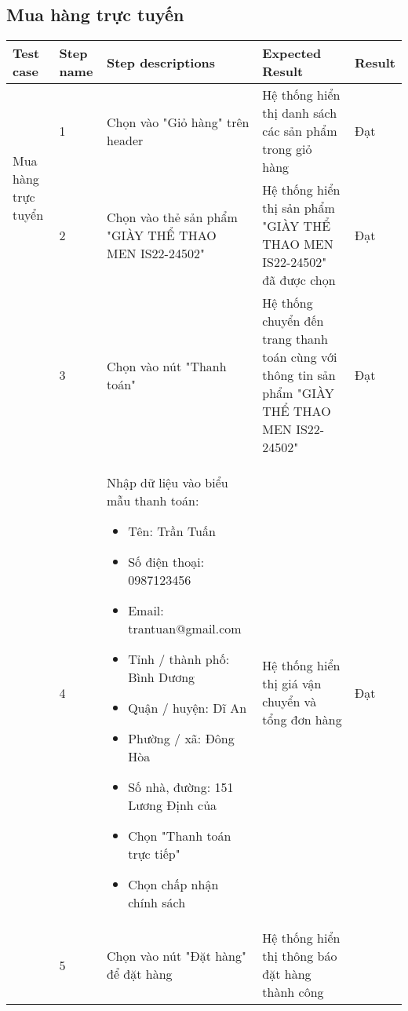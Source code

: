 \subsection{Mua hàng trực tuyến}
{
    \setlength\extrarowheight{6pt}
    \begin{longtable}{| p{2.5cm}| p{1cm}| p{5.5cm}| p{4.5cm} | p{1.5cm} |}
        \hline
        \textbf{Test case} & \textbf{Step name} & \textbf{Step descriptions} & \textbf{Expected Result} & \textbf{Result} \\
        \hline
        \multirow[t]{2}{2.5cm}{Mua hàng trực tuyển} & 
        1 & 
        Chọn vào "Giỏ hàng" trên header & 
        Hệ thống hiển thị danh sách các sản phẩm trong giỏ hàng & 
        Đạt \\
        \cline{2-5}
         & 2 & 
         Chọn vào thẻ sản phẩm "GIÀY THỂ THAO MEN IS22-24502" & 
         Hệ thống hiển thị sản phẩm "GIÀY THỂ THAO MEN IS22-24502" đã được chọn & 
         Đạt \\
        \cline{2-5}
         & 3 & 
         Chọn vào nút "Thanh toán" & 
         Hệ thống chuyển đến trang thanh toán cùng với thông tin sản phẩm "GIÀY THỂ THAO MEN IS22-24502" & 
         Đạt \\
        \cline{2-5}
         & 4 & 
         Nhập dữ liệu vào biểu mẫu thanh toán:
         \begin{itemize}
            \item Tên: Trần Tuấn
            \item Số điện thoại: 0987123456
            \item Email: trantuan@gmail.com
            \item Tỉnh / thành phố: Bình Dương
            \item Quận / huyện: Dĩ An
            \item Phường / xã: Đông Hòa
            \item Số nhà, đường: 151 Lương Định của
            \item Chọn "Thanh toán trực tiếp"
            \item Chọn chấp nhận chính sách
         \end{itemize}
         & 
         Hệ thống hiển thị giá vận chuyển và tổng đơn hàng & 
         Đạt \\
        \cline{2-5}
         & 5 & 
         Chọn vào nút "Đặt hàng" để đặt hàng & 
         Hệ thống hiển thị thông báo đặt hàng thành công & 

\end{longtable}}
